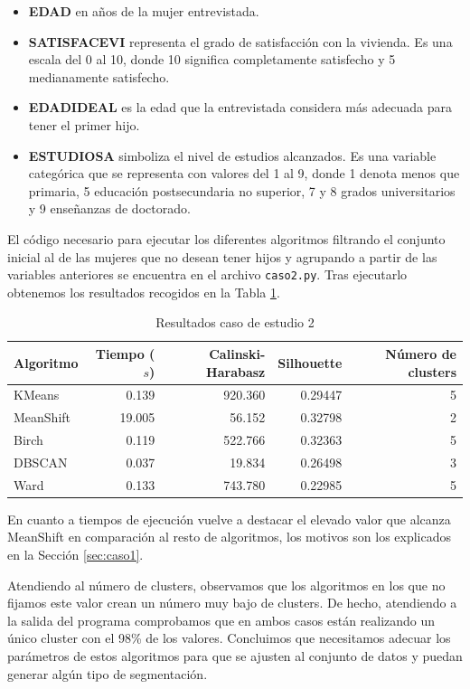 \documentclass[a4paper, 20pt]{article}
\begin{document}
\begin{itemize}
\item \textbf{EDAD} en años de la mujer entrevistada.
\item \textbf{SATISFACEVI} representa el grado de satisfacción con la vivienda. Es una escala del 0 al 10, donde 10 significa completamente satisfecho y 5 medianamente satisfecho.
\item \textbf{EDADIDEAL} es la edad que la entrevistada considera más adecuada para tener el primer hijo.
\item \textbf{ESTUDIOSA} simboliza el nivel de estudios alcanzados. Es una variable categórica que se representa con valores del 1 al 9, donde 1 denota menos que primaria, 5 educación postsecundaria no superior, 7 y 8 grados universitarios y 9 enseñanzas de doctorado.
\end{itemize}

El código necesario para ejecutar los diferentes algoritmos filtrando el conjunto inicial al de las mujeres que no desean tener hijos y agrupando a partir de las variables anteriores se encuentra en el archivo \texttt{caso2.py}. Tras ejecutarlo obtenemos los resultados recogidos en la Tabla \ref{tab:algorithms2}.

\begin{table}[H]
\centering
\caption{Resultados caso de estudio 2}
\label{tab:algorithms2}
\begin{tabular}{lrrrr}
\toprule
Algoritmo & Tiempo ($s$) & Calinski-Harabasz & Silhouette & Número de clusters\\
\midrule
KMeans & 0.139 & 920.360 & 0.29447 & 5 \\
MeanShift & 19.005 & 56.152 & 0.32798 & 2 \\
Birch & 0.119 & 522.766 & 0.32363 & 5 \\
DBSCAN & 0.037 & 19.834 & 0.26498 & 3 \\
Ward & 0.133 & 743.780 & 0.22985 & 5 \\
\bottomrule
\end{tabular}
\end{table}

En cuanto a tiempos de ejecución vuelve a destacar el elevado valor que alcanza MeanShift en comparación al resto de algoritmos, los motivos son los explicados en la Sección \ref{sec:caso1}.

Atendiendo al número de clusters, observamos que los algoritmos en los que no fijamos este valor crean un número muy bajo de clusters. De hecho, atendiendo a la salida del programa comprobamos que en ambos casos están realizando un único cluster con el 98\% de los valores. Concluimos que necesitamos adecuar los parámetros de estos algoritmos para que se ajusten al conjunto de datos y puedan generar algún tipo de segmentación.
\end{document}
